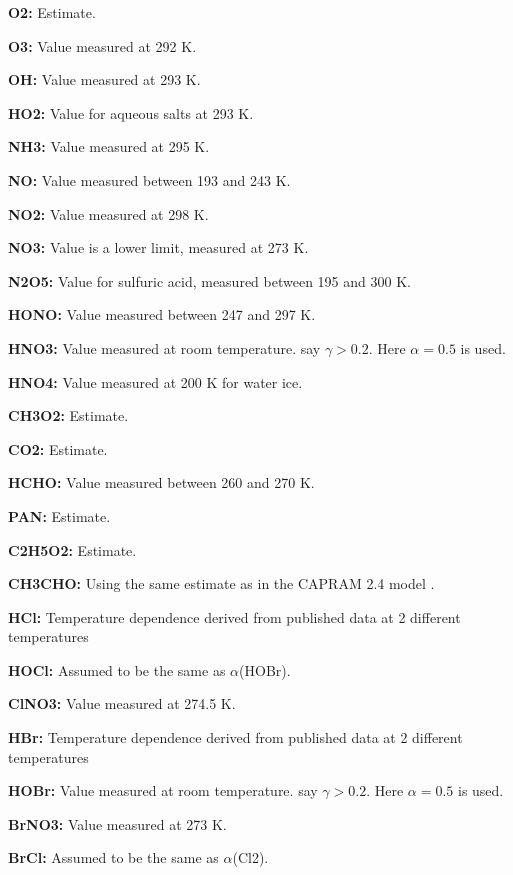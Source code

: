 \item {\bf  O2:} Estimate.
\item {\bf  O3:} Value measured at 292 \unit  {K}.
\item {\bf  OH:} Value measured at 293 \unit  {K}.
\item {\bf  HO2:} Value for aqueous salts at 293 \unit  {K}.
\item {\bf  NH3:} Value measured at 295 \unit  {K}.
\item {\bf  NO:} Value measured between 193 and 243 \unit  {K}.
\item {\bf  NO2:} Value measured at 298 \unit  {K}.
\item {\bf  NO3:} Value is a lower limit, measured at 273 \unit  {K}.
\item {\bf  N2O5:} Value for sulfuric acid, measured between 195 and 300 \unit  {K}.
\item {\bf  HONO:} Value measured between 247 and 297 \unit  {K}.
\item {\bf  HNO3:} Value measured at room temperature. \citet  {930} say $\gamma >0.2$. Here $\alpha =0.5$ is used.
\item {\bf  HNO4:} Value measured at 200 \unit  {K} for water ice.
\item {\bf  CH3O2:} Estimate.
\item {\bf  CO2:} Estimate.
\item {\bf  HCHO:} Value measured between 260 and 270 \unit  {K}.
\item {\bf  PAN:} Estimate.
\item {\bf  C2H5O2:} Estimate.
\item {\bf  CH3CHO:} Using the same estimate as in the CAPRAM 2.4 model \citep  {2573}.
\item {\bf  HCl:} Temperature dependence derived from published data at 2 different temperatures
\item {\bf  HOCl:} Assumed to be the same as $\alpha $(HOBr).
\item {\bf  ClNO3:} Value measured at 274.5 \unit  {K}.
\item {\bf  HBr:} Temperature dependence derived from published data at 2 different temperatures
\item {\bf  HOBr:} Value measured at room temperature. \citet  {930} say $\gamma >0.2$. Here $\alpha =0.5$ is used.
\item {\bf  BrNO3:} Value measured at 273 \unit  {K}.
\item {\bf  BrCl:} Assumed to be the same as $\alpha $(Cl2).
